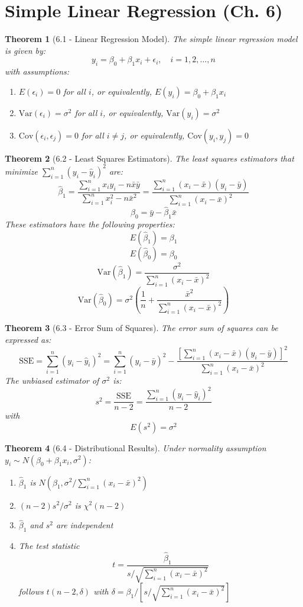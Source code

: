 \documentclass{article}
\newtheorem{theorem}{Theorem}[section]
\begin{document}
\section{Simple Linear Regression (Ch. 6)}

\begin{theorem}[6.1 - Linear Regression Model]
The simple linear regression model is given by:
\[y_i = \beta_0 + \beta_1 x_i + \epsilon_i, \quad i = 1, 2, \ldots, n\]
with assumptions:
\begin{enumerate}
\item $E(\epsilon_i) = 0$ for all $i$, or equivalently, $E(y_i) = \beta_0 + \beta_1x_i$
\item $\text{Var}(\epsilon_i) = \sigma^2$ for all $i$, or equivalently, $\text{Var}(y_i) = \sigma^2$
\item $\text{Cov}(\epsilon_i, \epsilon_j) = 0$ for all $i \neq j$, or equivalently, $\text{Cov}(y_i, y_j) = 0$
\end{enumerate}
\end{theorem}

\begin{theorem}[6.2 - Least Squares Estimators]
The least squares estimators that minimize $\sum_{i=1}^n (y_i - \hat{y}_i)^2$ are:
\[\hat{\beta}_1 = \frac{\sum_{i=1}^n x_i y_i - n\bar{x}\bar{y}}{\sum_{i=1}^n x_i^2 - n\bar{x}^2} = \frac{\sum_{i=1}^n (x_i - \bar{x})(y_i - \bar{y})}{\sum_{i=1}^n (x_i - \bar{x})^2}\]
\[\hat{\beta}_0 = \bar{y} - \hat{\beta}_1\bar{x}\]
These estimators have the following properties:
\[E(\hat{\beta}_1) = \beta_1\]
\[E(\hat{\beta}_0) = \beta_0\]
\[\text{Var}(\hat{\beta}_1) = \frac{\sigma^2}{\sum_{i=1}^n (x_i - \bar{x})^2}\]
\[\text{Var}(\hat{\beta}_0) = \sigma^2\left(\frac{1}{n} + \frac{\bar{x}^2}{\sum_{i=1}^n (x_i - \bar{x})^2}\right)\]
\end{theorem}

\begin{theorem}[6.3 - Error Sum of Squares]
The error sum of squares can be expressed as:
\[\text{SSE} = \sum_{i=1}^n (y_i - \hat{y}_i)^2 = \sum_{i=1}^n (y_i - \bar{y})^2 - \frac{[\sum_{i=1}^n (x_i - \bar{x})(y_i - \bar{y})]^2}{\sum_{i=1}^n (x_i - \bar{x})^2}\]
The unbiased estimator of $\sigma^2$ is:
\[s^2 = \frac{\text{SSE}}{n-2} = \frac{\sum_{i=1}^n (y_i - \hat{y}_i)^2}{n-2}\]
with
\[E(s^2) = \sigma^2\]
\end{theorem}

\begin{theorem}[6.4 - Distributional Results]
Under normality assumption $y_i \sim N(\beta_0 + \beta_1x_i, \sigma^2)$:
\begin{enumerate}
\item $\hat{\beta}_1$ is $N(\beta_1, \sigma^2/\sum_{i=1}^n (x_i - \bar{x})^2)$
\item $(n-2)s^2/\sigma^2$ is $\chi^2(n-2)$
\item $\hat{\beta}_1$ and $s^2$ are independent
\item The test statistic
\[t = \frac{\hat{\beta}_1}{s/\sqrt{\sum_{i=1}^n (x_i - \bar{x})^2}}\]
follows $t(n-2, \delta)$ with $\delta = \beta_1/[s/\sqrt{\sum_{i=1}^n (x_i - \bar{x})^2}]$
\end{enumerate}
\end{theorem}
\end{document}
